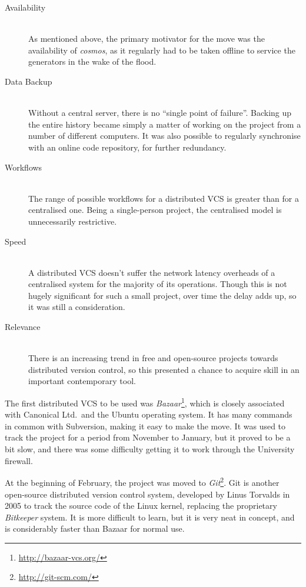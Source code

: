 \begin{description}
\item[Availability] \hfill \\
As mentioned above, the primary motivator for the move was the availability of
\emph{cosmos}, as it regularly had to be taken offline to service the generators
in the wake of the flood. 
\item[Data Backup] \hfill \\
Without a central server, there is no ``single point of failure''. Backing
up the entire history became simply a matter of working on the project from a
number of different computers. It was also possible to regularly synchronise
with an online code repository, for further redundancy.
\item[Workflows] \hfill \\
The range of possible workflows for a distributed VCS is greater than for a
centralised one. Being a single-person project, the centralised model is
unnecessarily restrictive.
\item[Speed] \hfill \\
A distributed VCS doesn't suffer the network latency overheads of a centralised
system for the majority of its operations. Though this is not hugely significant
for such a small project, over time the delay adds up, so it was still a
consideration.
\item[Relevance] \hfill \\
There is an increasing trend in free and open-source projects towards
distributed version control, so this presented a chance to acquire skill in an
important contemporary tool.
\end{description}

The first distributed VCS to be used was
\emph{Bazaar}\footnote{\url{http://bazaar-vcs.org/}}, which is closely
associated with Canonical Ltd.\ and the Ubuntu operating system. It has many
commands in common with Subversion, making it easy to make the move. It was used
to track the project for a period from November to January, but it proved to be
a bit slow, and there was some difficulty getting it to work through the
University firewall.

At the beginning of February, the project was moved to
\emph{Git}\footnote{\url{http://git-scm.com/}}. Git is another open-source
distributed version control system, developed by Linus Torvalds in 2005 to track
the source code of the Linux kernel, replacing the proprietary \emph{Bitkeeper}
system. It is more difficult to learn, but it is very neat in concept, and is
considerably faster than Bazaar for normal use.

